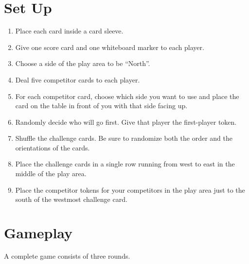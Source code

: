 \documentclass[a6paper, 11pt, parskip=half, DIV=15]{scrartcl}
\begin{document}
%     
%      
            
\newpage

\section*{Set Up}
\begin{enumerate}[leftmargin=*]
	\item Place each card inside a card sleeve.
	\item Give one score card and one whiteboard marker to each player.
	\item Choose a side of the play area to be ``North''.
	\item Deal five competitor cards to each player.
	\item For each competitor card, choose which side you want to use and place the card on the table in front of you  with that side facing up.
	\item Randomly decide who will go first. Give that player the first-player token.
	\item Shuffle the challenge cards. Be sure to randomize both the order and the orientations of the cards.
	\item Place the challenge cards in a single row running from west to east in the middle of the play area.
	\item Place the competitor tokens for your competitors in the play area just to the south of the westmost challenge card.
\end{enumerate}
 
\newpage

\section*{Gameplay}
A complete game consists of three rounds.
\end{document}
